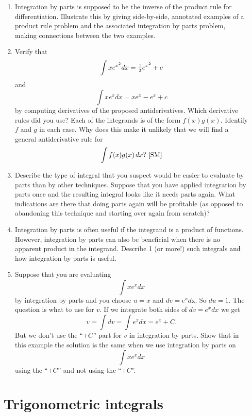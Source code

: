 \begin{enumerate}
\item  Integration by parts is supposed to be the inverse of the product rule for differentiation.  Illustrate this by giving side-by-side, annotated examples of a product rule problem and the associated integration by parts problem, making connections between the two examples.

\item  Verify that $$\int {xe^{x^2 } dx}  = {\textstyle{1 \over 2}}e^{x^2 }  + c$$ and $$\int {xe^x dx}  = xe^x  - e^x  + c$$ by computing derivatives of the proposed antiderivatives.  Which derivative rules did you use?  Each of the integrands is of the form $f(x)g(x)$.  Identify $f$ and $g$ in each case.  Why does this make it unlikely that we will find a general antiderivative rule for $$\int {f(x)g(x)\,} dx? \ \cite{SM}$$  

\item  Describe the type of integral that you suspect would be easier to evaluate by parts than by other techniques.  Suppose that you have applied integration by parts once and the resulting integral looks like it needs parts again.  What indications are there that doing parts again will be profitable (as opposed to abandoning this technique and starting over again from scratch)?

\item  Integration by parts is often useful if the integrand is a product of functions.  However, integration by parts can also be beneficial when there is no apparent product in the integrand.  Describe 1 (or more!) such integrals and how integration by parts is useful.

\item  Suppose that you are evaluating $$\int {xe^x dx} $$ by integration by parts and you choose $u = x$ and $dv  = e^x d$x.  So $du = 1$.  The question is what to use for $v$.  If we integrate both sides of $dv  = e^x dx$ we get $$v = \int {dv}  = \int {e^x dx}  = e^x  + C.$$  But we don't use the ``$+ C$'' part for $v$ in integration by parts.  Show that in this example the solution is the same when we use integration by parts on $$\int {xe^x dx} $$ using the ``$+ C$'' and not using the ``$+ C$''. 

\end{enumerate}\section{Trigonometric integrals}\begin{enumerate}


\end{enumerate}
